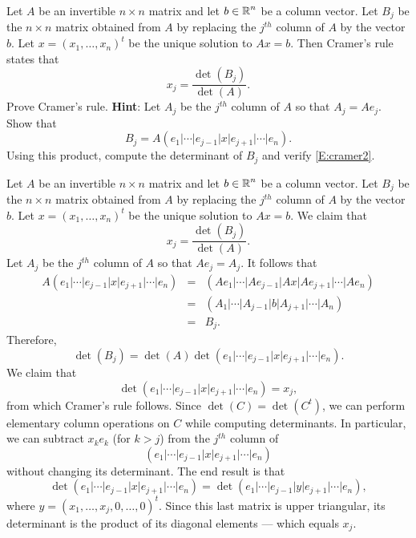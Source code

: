 \documentclass{ximera}
\begin{document}
\begin{exercise} \label{c10.1.c9}
Let $A$ be an invertible $n\times n$ matrix and let $b\in\mbox{$\mathbb{R}$}^n$ be a column 
vector. Let $B_j$ be the $n\times n$ matrix obtained from $A$ by replacing the 
$j^{th}$ column of $A$ by the vector $b$.  Let $x=(x_1,\ldots,x_n)^t$ be the 
unique solution to $Ax=b$. Then Cramer's rule  states that
\begin{equation}  \label{E:cramer2}
x_j = \frac{\det(B_j)}{\det(A)}.
\end{equation}
Prove Cramer's rule.  {\bf Hint}: Let $A_j$ be the $j^{th}$ column of $A$ so
that $A_j = Ae_j$.  Show that 
\[
B_j = A (e_1|\cdots|e_{j-1}|x|e_{j+1}|\cdots|e_n).
\]
Using this product, compute the determinant of $B_j$ and verify \eqref{E:cramer2}.

\begin{solution}
\soln
Let $A$ be an invertible $n\times n$ matrix and let $b\in\mbox{$\mathbb{R}$}^n$ be a column 
vector. Let $B_j$ be the $n\times n$ matrix obtained from $A$ by replacing 
the $j^{th}$ column of $A$ by the vector $b$.  Let $x=(x_1,\ldots,x_n)^t$ be 
the unique solution to $Ax=b$.  We claim that
\[
x_j = \frac{\det(B_j)}{\det(A)}.
\]
Let $A_j$ be the $j^{th}$ column of $A$ so that $Ae_j=A_j$.  It follows that 
\begin{eqnarray*}
A (e_1|\cdots|e_{j-1}|x|e_{j+1}|\cdots|e_n) & = & 
(A e_1|\cdots|A e_{j-1}|A x|A e_{j+1}|\cdots|A e_n)\\
& = & (A_1|\cdots|A_{j-1}|b|A_{j+1}|\cdots|A_n) \\
& = & B_j.
\end{eqnarray*}
Therefore,
\[
\det(B_j) = \det(A)\det(e_1|\cdots|e_{j-1}|x|e_{j+1}|\cdots|e_n).
\]
We claim that 
\[
\det(e_1|\cdots|e_{j-1}|x|e_{j+1}|\cdots|e_n)=x_j,
\]
from which Cramer's rule follows.  Since $\det(C)=\det(C^t)$, we can perform
elementary column operations on $C$ while computing determinants.  In
particular, we can subtract $x_ke_k$ (for $k>j$) from the $j^{th}$ column of
\[
(e_1|\cdots|e_{j-1}|x|e_{j+1}|\cdots|e_n)
\]
without changing its determinant.  The end result is that 
\[
\det(e_1|\cdots|e_{j-1}|x|e_{j+1}|\cdots|e_n)=
\det(e_1|\cdots|e_{j-1}|y|e_{j+1}|\cdots|e_n),
\]
where $y=(x_1,\ldots,x_j,0,\ldots,0)^t$.  Since this last matrix is upper
triangular, its determinant is the product of its diagonal elements ---
which equals $x_j$. 


\end{solution}
\end{exercise}
\end{document}

